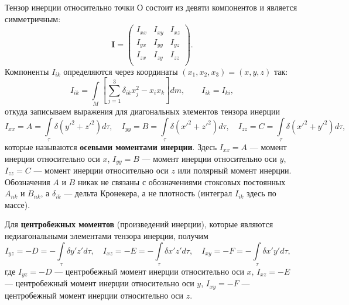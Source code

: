 \documentclass[11pt, a4paper,addpoints]{exam}
\theoremstyle{remark}
\begin{document}
    Тензор инерции относительно точки О состоит из девяти компонентов и является симметричным:
    \begin{equation*}
        \pmb I = \begin{pmatrix}
            I_{xx} & I_{xy} & I_{xz} \\
            I_{yx} & I_{yy} & I_{yz} \\
            I_{zx} & I_{zy} & I_{zz} \\
        \end{pmatrix}.
    \end{equation*}
    Компоненты $I_{ik}$ определяются через координаты $(x_1, x_2, x_3) = (x, y, z)$ так:
    \begin{equation*}
        I_{ik} = \int\limits_M 
        \left[ \sum\limits_{j = 1}^{3} \delta_{ik} x_j^2 - x_i x_k \right] dm, \qquad
        I_{ik} = I_{ki},
    \end{equation*}
    откуда записываем  выражения для диагональных элементов тензора инерции
    \begin{equation*}
        I_{xx} = A = \int\limits_\tau \delta \left( y'^2 + z'^2 \right) d\tau, \quad
        I_{yy} = B = \int\limits_\tau \delta \left( x'^2 + z'^2 \right) d\tau, \quad
        I_{zz} = C = \int\limits_\tau \delta \left( x'^2 + y'^2 \right) d\tau, \quad
    \end{equation*}
    которые называются \textbf{осевыми моментами инерции}. Здесь $I_{xx} = A$ --- момент инерции относительно
    оси $x$, $I_{yy} = B$ --- момент инерции относительно оси $y$,
    $I_{zz} = C$ --- момент инерции относительно оси $z$ или полярный момент инерции.
    Обозначения $A$ и $B$ никак не связаны с обозначениями стоксовых постоянных $A_{nk}$ и
    $B_{nk}$, а $\delta_{ik}$ --- дельта Кронекера, а не плотность (интеграл $I_{ik}$ здесь по массе).

    Для  \textbf{центробежных моментов} (произведений инерции), которые являются недиагональными элементами
    тензора инерции, получим
    \begin{equation*}
        I_{yz} = -D = -\int\limits_\tau \delta y' z' d\tau, \quad
        I_{xz} = -E = -\int\limits_\tau \delta x' z' d\tau, \quad
        I_{xy} = -F = -\int\limits_\tau \delta x' y' d\tau, \quad
    \end{equation*}
    где $I_{yz} = -D$ --- центробежный момент инерции относительно оси $x$,
    $I_{xz} = -E$ --- центробежный момент инерции относительно оси $y$,
    $I_{xy} = -F$ --- центробежный момент инерции относительно оси $z$.
\end{document}
